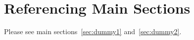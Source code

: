 \section{Referencing Main Sections}

Please see main sections~\ref{sec:dummy1} and~\ref{sec:dummy2}.
